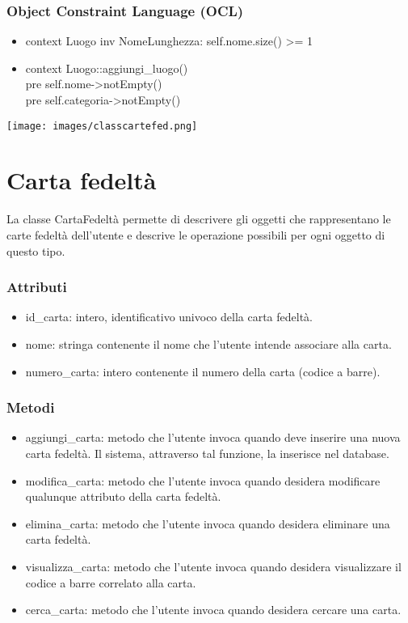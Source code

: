 \documentclass[a4paper,12pt]{article}
\begin{document}
\subsubsection*{Object Constraint Language (OCL)}
\begin{itemize}
\item {\ttfamily context Luogo inv NomeLunghezza: self.nome.size() >= 1}
\item {\ttfamily context Luogo::aggiungi\_luogo() \\pre self.nome->notEmpty()
\\pre self.categoria->notEmpty()}

\end{itemize}
\newpage
\begin{center}
  \texttt{[image: images/classcartefed.png]}
\end{center}
\section{Carta fedeltà}

La classe {\sffamily CartaFedeltà} permette di descrivere gli oggetti che rappresentano le carte fedeltà dell'utente e descrive le operazione possibili per ogni oggetto di questo tipo.
\subsubsection*{Attributi}
\begin{itemize} \setlength\itemsep{0.01em}
\item {\ttfamily id\_carta}: intero, identificativo univoco della carta fedeltà.
\item {\ttfamily nome}: stringa contenente il nome che l'utente intende associare alla carta.
\item {\ttfamily numero\_carta}: intero contenente il numero della carta (codice a barre).
\end{itemize}
\subsubsection*{Metodi}
\begin{itemize} \setlength\itemsep{0.01em}
\item {\ttfamily aggiungi\_carta}: metodo che l'utente invoca quando deve inserire una nuova carta fedeltà. Il sistema, attraverso tal funzione, la inserisce nel database.
\item {\ttfamily modifica\_carta}: metodo che l'utente invoca quando desidera modificare qualunque attributo della carta fedeltà.
\item {\ttfamily elimina\_carta}: metodo che l'utente invoca quando desidera eliminare una carta fedeltà. 
\item {\ttfamily visualizza\_carta}: metodo che l'utente invoca quando desidera visualizzare il codice a barre correlato alla carta.
\item {\ttfamily cerca\_carta}: metodo che l'utente invoca quando desidera cercare una carta. 
\end{itemize}
\end{document}

